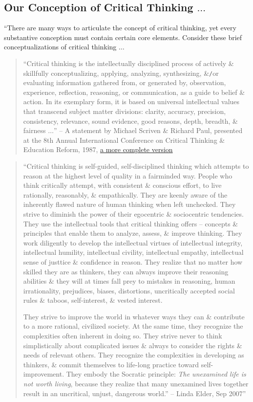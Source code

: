 \documentclass[oneside]{book}
\numberwithin{equation}{section}
\begin{document}
\subsection{Our Conception of Critical Thinking $\ldots$}
``There are many ways to articulate the concept of critical thinking, yet every substantive conception must contain certain core elements. Consider these brief conceptualizations of critical thinking $\ldots$
\begin{quotation}
	``Critical thinking is the intellectually disciplined process of actively \& skillfully conceptualizing, applying, analyzing, synthesizing, \&\texttt{/}or evaluating information gathered from, or generated by, observation, experience, reflection, reasoning, or communication, as a guide to belief \& action. In its exemplary form, it is based on universal intellectual values that transcend subject matter divisions: clarity, accuracy, precision, consistency, relevance, sound evidence, good reasons, depth, breadth, \& fairness $\ldots$'' -- A statement by Michael Scriven \& Richard Paul, presented at the 8th Annual International Conference on Critical Thinking \& Education Reform, 1987, \href{https://www.criticalthinking.org/aboutCT/define_critical_thinking.cfm}{a more complete version}
\end{quotation}

\begin{quotation}
	``Critical thinking is self-guided, self-disciplined thinking which attempts to reason at the highest level of quality in a fairminded way. People who think critically attempt, with consistent \& conscious effort, to live rationally, reasonably, \& empathically. They are keenly aware of the inherently flawed nature of human thinking when left unchecked. They strive to diminish the power of their egocentric \& sociocentric tendencies. They use the intellectual tools that critical thinking offers -- concepts \& principles that enable them to analyze, assess, \& improve thinking. They work diligently to develop the intellectual virtues of intellectual integrity, intellectual humility, intellectual civility, intellectual empathy, intellectual sense of justtice \& confidence in reason. They realize that no matter how skilled they are as thinkers, they can always improve their reasoning abilities \& they will at times fall prey to mistakes in reasoning, human irrationality, prejudices, biases, distortions, uncritically accepted social rules \& taboos, self-interest, \& vested interest.
	
	They strive to improve the world in whatever ways they can \& contribute to a more rational, civilized society. At the same time, they recognize the complexities often inherent in doing so. They strive never to think simplistically about complicated issues \& always to consider the rights \& needs of relevant others. They recognize the complexities in developing as thinkers, \& commit themselves to life-long practice toward self-improvement. They embody the Socratic principle: \textit{The unexamined life is not worth living}, because they realize that many unexamined lives together result in an uncritical, unjust, dangerous world.'' -- Linda Elder, Sep 2007''
\end{quotation}
\end{document}
